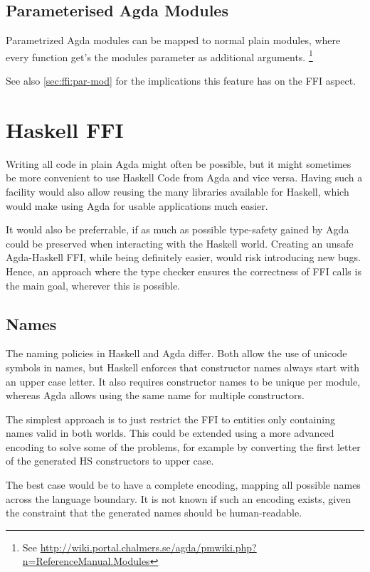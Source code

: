 \documentclass[12pt, a4paper, twoside]{report}
\begin{document}
\subsection{Parameterised Agda Modules}
Parametrized Agda modules can be mapped to normal plain modules, where every function get's the
modules parameter as additional arguments.
\footnote{See \url{http://wiki.portal.chalmers.se/agda/pmwiki.php?n=ReferenceManual.Modules}}

See also \ref{sec:ffi:par-mod} for the implications this feature has on the FFI aspect.

\section{Haskell FFI}
\label{sec:prop:hs-ffi}
Writing all code in plain Agda might often be possible, but it might sometimes be more
convenient to use Haskell Code from Agda and vice versa. Having such a facility would
also allow reusing the many libraries available for Haskell, which would make using Agda
for usable applications much easier.

It would also be preferrable, if as much as possible type-safety gained by Agda could be
preserved when interacting with the Haskell world. Creating an unsafe Agda-Haskell
FFI, while being definitely easier, would risk introducing new bugs. Hence, an approach
where the type checker ensures the correctness of FFI calls is the main goal, wherever
this is possible.


\subsection{Names}
The naming policies in Haskell and Agda differ. Both allow the use of unicode symbols in names, but Haskell enforces
that constructor names always start with an upper case letter. It also requires constructor names to be unique
per module, whereas Agda allows using the same name for multiple constructors.

The simplest approach is to just restrict the FFI to entities only containing names valid in both worlds.
This could be extended using a more advanced encoding to solve some of the problems, for example
by converting the first letter of the generated HS constructors to upper case.

The best case would be to have a complete encoding, mapping all possible names across the language boundary. It is not known
if such an encoding exists, given the constraint that the generated names should be human-readable.
\end{document}
